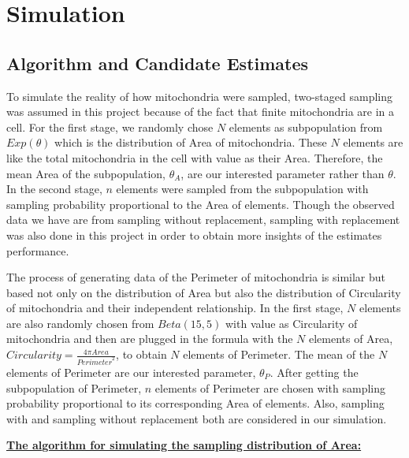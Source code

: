 \documentclass{article}\usepackage[]{graphicx}\usepackage[]{color}
\numberwithin{figure}{subsection} %
\numberwithin{table}{subsection} %
\begin{document}
\setcounter{section}{3} %
\section{Simulation}
\setcounter{subsection}{1}
\subsection{Algorithm and Candidate Estimates}
To simulate the reality of how mitochondria were sampled, two-staged sampling was assumed in this project because of the fact that finite mitochondria are in a cell. For the first stage, we randomly chose $N$ elements as subpopulation from $Exp(\theta)$ which is the distribution of Area of mitochondria. These $N$ elements are like the total mitochondria in the cell with value as their Area. Therefore, the mean Area of the subpopulation, ${\theta}_{A}$, are our interested parameter rather than $\theta$. In the second stage, $n$ elements were sampled from the subpopulation with sampling probability proportional to the Area of elements. Though the observed data we have are from sampling without replacement, sampling with replacement was also done in this project in order to obtain more insights of the estimates performance.

The process of generating data of the Perimeter of mitochondria is similar but based not only on the distribution of Area but also the distribution of Circularity of mitochondria and their independent relationship. In the first stage, $N$ elements are also randomly chosen from $Beta(15, 5)$ with value as Circularity of mitochondria and then are plugged in the formula with the $N$ elements of Area, $Circularity=\frac{4\pi Area}{{Perimeter}^{2}}$, to obtain $N$ elements of Perimeter. The mean of the $N$ elements of Perimeter are our interested parameter, ${\theta}_{P}$. After getting the subpopulation of Perimeter, $n$ elements of Perimeter are chosen with sampling probability proportional to its corresponding Area of elements. Also, sampling with and sampling without replacement both are considered in our simulation. 

\bigskip
\setlength{\parskip}{0em}
\noindent\textbf{\underline{The algorithm for simulating the sampling distribution of Area:}}
\end{document}
